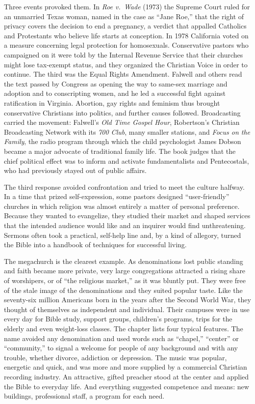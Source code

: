 Three events provoked them. In \emph{Roe v.~Wade} (1973) the Supreme Court ruled for an unmarried
Texas woman, named in the case as ``Jane Roe,'' that the right of privacy covers the decision to end
a pregnancy, a verdict that appalled Catholics and Protestants who believe life starts at conception.
In 1978 California voted on a measure concerning legal protection for homosexuals. Conservative
pastors who campaigned on it were told by the Internal Revenue Service that their churches might lose
tax-exempt status, and they organized the Christian Voice in order to continue. The third was the
Equal Rights Amendment. Falwell and others read the text passed by Congress as opening the way to
same-sex marriage and adoption and to conscripting women, and he led a successful fight against
ratification in Virginia. Abortion, gay rights and feminism thus brought conservative Christians
into politics, and further causes followed. Broadcasting carried the movement: Falwell's \emph{Old
Time Gospel Hour}, Robertson's Christian Broadcasting Network with its \emph{700 Club}, many smaller
stations, and \emph{Focus on the Family}, the radio program through which the child psychologist
James Dobson became a major advocate of traditional family life. The book judges that the chief
political effect was to inform and activate fundamentalists and Pentecostals, who had previously
stayed out of public affairs.

The third response avoided confrontation and tried to meet the culture halfway. In a time that
prized self-expression, some pastors designed ``user-friendly'' churches in which religion was almost
entirely a matter of personal preference. Because they wanted to evangelize, they studied their
market and shaped services that the intended audience would like and an inquirer would find
unthreatening. Sermons often took a practical, self-help line and, by a kind of allegory, turned the
Bible into a handbook of techniques for successful living.

The megachurch is the clearest example. As denominations lost public standing and faith became more
private, very large congregations attracted a rising share of worshipers, or of ``the religious
market,'' as it was bluntly put. They were free of the stale image of the denominations and they
suited popular taste. Like the seventy-six million Americans born in the years after the Second World
War, they thought of themselves as independent and individual. Their campuses were in use every day
for Bible study, support groups, children's programs, trips for the elderly and even weight-loss
classes. The chapter lists four typical features. The name avoided any denomination and used words
such as ``chapel,'' ``center'' or ``community,'' to signal a welcome for people of any background and
with any trouble, whether divorce, addiction or depression. The music was popular, energetic and
quick, and was more and more supplied by a commercial Christian recording industry. An attractive,
gifted preacher stood at the center and applied the Bible to everyday life. And everything suggested
competence and means: new buildings, professional staff, a program for each need.

